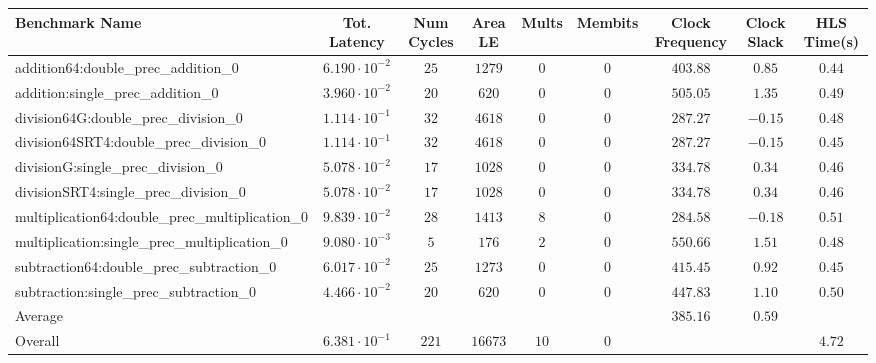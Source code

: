 \begin{tabular}{|l|c|c|c|c|c|c|c|c|}
\hline
Benchmark Name                                   & Tot. Latency            & Num Cycles & Area LE   & Mults  & Membits & Clock Frequency & Clock Slack & HLS Time(s) \\
\hline
addition64:double\_prec\_addition\_0             & $ 6.190 \cdot 10^{-2} $ & $ 25     $ & $ 1279  $ & $ 0  $ & $ 0   $ & $ 403.88      $ & $ 0.85    $ & $ 0.44    $ \\
addition:single\_prec\_addition\_0               & $ 3.960 \cdot 10^{-2} $ & $ 20     $ & $ 620   $ & $ 0  $ & $ 0   $ & $ 505.05      $ & $ 1.35    $ & $ 0.49    $ \\
division64G:double\_prec\_division\_0            & $ 1.114 \cdot 10^{-1} $ & $ 32     $ & $ 4618  $ & $ 0  $ & $ 0   $ & $ 287.27      $ & $ -0.15   $ & $ 0.48    $ \\
division64SRT4:double\_prec\_division\_0         & $ 1.114 \cdot 10^{-1} $ & $ 32     $ & $ 4618  $ & $ 0  $ & $ 0   $ & $ 287.27      $ & $ -0.15   $ & $ 0.45    $ \\
divisionG:single\_prec\_division\_0              & $ 5.078 \cdot 10^{-2} $ & $ 17     $ & $ 1028  $ & $ 0  $ & $ 0   $ & $ 334.78      $ & $ 0.34    $ & $ 0.46    $ \\
divisionSRT4:single\_prec\_division\_0           & $ 5.078 \cdot 10^{-2} $ & $ 17     $ & $ 1028  $ & $ 0  $ & $ 0   $ & $ 334.78      $ & $ 0.34    $ & $ 0.46    $ \\
multiplication64:double\_prec\_multiplication\_0 & $ 9.839 \cdot 10^{-2} $ & $ 28     $ & $ 1413  $ & $ 8  $ & $ 0   $ & $ 284.58      $ & $ -0.18   $ & $ 0.51    $ \\
multiplication:single\_prec\_multiplication\_0   & $ 9.080 \cdot 10^{-3} $ & $ 5      $ & $ 176   $ & $ 2  $ & $ 0   $ & $ 550.66      $ & $ 1.51    $ & $ 0.48    $ \\
subtraction64:double\_prec\_subtraction\_0       & $ 6.017 \cdot 10^{-2} $ & $ 25     $ & $ 1273  $ & $ 0  $ & $ 0   $ & $ 415.45      $ & $ 0.92    $ & $ 0.45    $ \\
subtraction:single\_prec\_subtraction\_0         & $ 4.466 \cdot 10^{-2} $ & $ 20     $ & $ 620   $ & $ 0  $ & $ 0   $ & $ 447.83      $ & $ 1.10    $ & $ 0.50    $ \\
\hline
Average                                          & $                     $ & $        $ & $       $ & $    $ & $     $ & $ 385.16      $ & $ 0.59    $ & $         $ \\
\hline
Overall                                          & $ 6.381 \cdot 10^{-1} $ & $ 221    $ & $ 16673 $ & $ 10 $ & $ 0   $ & $             $ & $         $ & $ 4.72    $ \\
\hline
\end{tabular}
